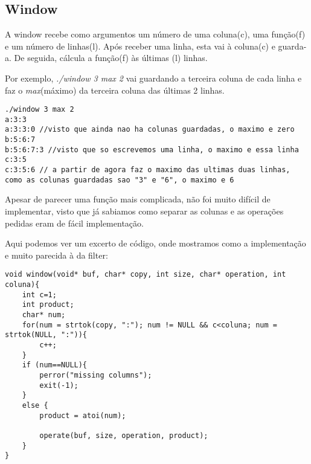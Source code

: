\documentclass{article}
\begin{document}
\subsection{Window}
\par A window recebe como argumentos um número de uma coluna(c), uma função(f) e um número de linhas(l). Após receber uma linha, esta vai à coluna(c) e guarda-a. De seguida, cálcula a função(f) às últimas (l) linhas.
\par Por exemplo, \emph{./window 3 max 2} vai guardando a terceira coluna de cada linha e faz o \emph{max}(máximo) da terceira coluna das últimas 2 linhas.
\begin{lstlisting}
./window 3 max 2
a:3:3
a:3:3:0 //visto que ainda nao ha colunas guardadas, o maximo e zero
b:5:6:7
b:5:6:7:3 //visto que so escrevemos uma linha, o maximo e essa linha
c:3:5
c:3:5:6 // a partir de agora faz o maximo das ultimas duas linhas, como as colunas guardadas sao "3" e "6", o maximo e 6
\end{lstlisting}
\par Apesar de parecer uma função mais complicada, não foi muito difícil de implementar, visto que já sabiamos como separar as colunas e as operações pedidas eram de fácil implementação.
\par Aqui podemos ver um excerto de código, onde mostramos como a implementação e muito parecida à da filter:
\begin{lstlisting}
void window(void* buf, char* copy, int size, char* operation, int coluna){
    int c=1;
    int product;
    char* num;
    for(num = strtok(copy, ":"); num != NULL && c<coluna; num = strtok(NULL, ":")){
        c++;
    }
    if (num==NULL){
        perror("missing columns");
        exit(-1);
    }
    else {
        product = atoi(num);

        operate(buf, size, operation, product);
    }
}
\end{lstlisting}
\end{document}
